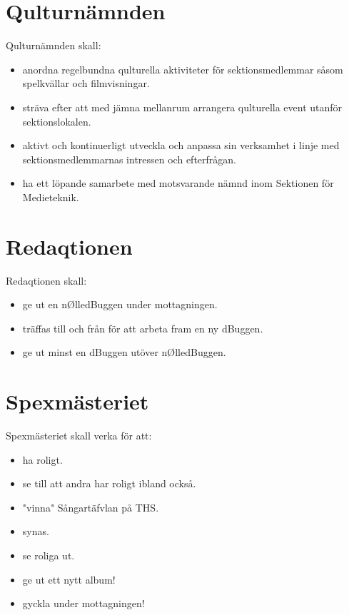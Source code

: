 \documentclass{dgovdoc}
\begin{document}
\section{Qulturnämnden}
Qulturnämnden skall:
\begin{itemize}
\item anordna regelbundna qulturella aktiviteter för sektionsmedlemmar såsom spelkvällar och filmvisningar.
\item sträva efter att med jämna mellanrum arrangera qulturella event utanför sektionslokalen.
\item aktivt och kontinuerligt utveckla och anpassa sin verksamhet i linje med sektionsmedlemmarnas intressen och efterfrågan.
\item ha ett löpande samarbete med motsvarande nämnd inom Sektionen för Medieteknik.
\end{itemize}

\section{Redaqtionen}
Redaqtionen skall:
\begin{itemize}
\item ge ut en n\O lledBuggen under mottagningen.
\item träffas till och från för att arbeta fram en ny dBuggen.
\item ge ut minst en dBuggen utöver n\O lledBuggen. 
\end{itemize}

\section{Spexmästeriet}
Spexmästeriet skall verka för att:
\begin{itemize}
\item ha roligt.
\item se till att andra har roligt ibland också.
\item "vinna" Sångartäfvlan på THS.
\item synas.
\item se roliga ut.
\item ge ut ett nytt album!
\item gyckla under mottagningen!
\end{itemize}
\end{document}
